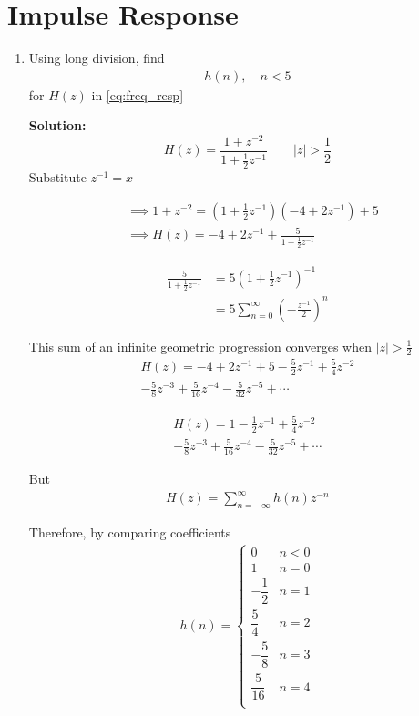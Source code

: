 \documentclass[journal,12pt,twocolumn]{IEEEtran}
\newcommand{\solution}{\noindent \textbf{Solution: }}
\providecommand{\brak}[1]{\ensuremath{\left(#1\right)}}
\providecommand{\abs}[1]{\left\vert#1\right\vert}
\numberwithin{equation}{section}
\renewcommand\thesection{\arabic{section}}
\begin{document}
	\section{Impulse Response}
	\begin{enumerate}[label=\thesection.\arabic*]
	\item Using long division, find
	\begin{align}
		h(n), \quad n < 5
	\end{align}
	for $H(z)$ in \eqref{eq:freq_resp}
	
	\solution 
	\begin{equation}
		H(z) = \frac{1 + z^{-2}}{1 + \frac12 z^{-1}} \qquad \abs{z} > \frac12
	\end{equation}
	Substitute $z^{-1} = x$
	
	
	\begin{align}
		&\implies 1 + z^{-2} = \brak{1 + \frac12 z^{-1}}\brak{-4 + 2z^{-1}} + 5 \\
		&\implies H(z) = -4 + 2z^{-1} + \frac{5}{1 + \frac12 z^{-1}}
	\end{align}
	
	\begin{align}
		\frac{5}{1 + \frac12 z^{-1}} &= 5 \brak{1 + \frac12 z^{-1}}^{-1} \\
		&= 5 \sum_{n=0}^\infty \brak{-\frac{z^{-1}}{2}}^n
	\end{align}
	
	This sum of an infinite geometric progression converges when $\abs{z} > \frac12$
	\begin{multline}
		H(z) = -4 + 2z^{-1} + 5 - \frac{5}{2}z^{-1} + \frac{5}{4}z^{-2}\\ - \frac{5}{8}z^{-3}  + \frac{5}{16}z^{-4} - \frac{5}{32}z^{-5} + \cdots
	\end{multline}
	
	\begin{multline}
		H(z) = 1  - \frac{1}{2}z^{-1} + \frac{5}{4}z^{-2}\\ - \frac{5}{8}z^{-3}  + \frac{5}{16}z^{-4} - \frac{5}{32}z^{-5} + \cdots
	\end{multline}
	
	But
	\begin{align}
		H(z) = \sum_{n=-\infty}^\infty h(n) z^{-n}
	\end{align}
	
	Therefore, by comparing coefficients
	\begin{align}
		h(n) = 
		\begin{cases}
			0 & n < 0 \\
			1 & n = 0 \\
			-\dfrac12 & n = 1 \\
			\dfrac{5}{4} & n = 2 \\
			-\dfrac{5}{8} & n = 3 \\
			\dfrac{5}{16} & n = 4 \\
		\end{cases}
	\end{align}
	

\end{enumerate}
\end{document}
